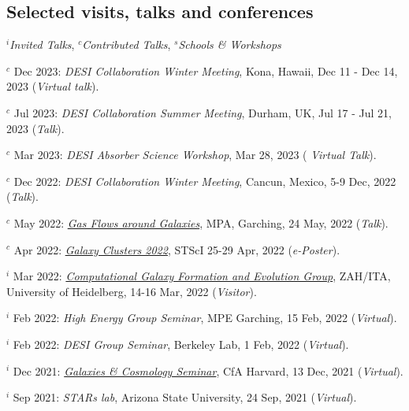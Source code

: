 \documentclass[12pt,letterpaper]{article}
\begin{document}
\subsection{Selected visits, talks and conferences}
$^i$\emph{Invited Talks}, $^c$\emph{Contributed Talks}, $^s$\emph{Schools \& Workshops}
\begin{list}{}{\cvlist}
\item $^c$ Dec 2023:  \emph{DESI Collaboration Winter Meeting}, Kona, Hawaii, Dec 11 - Dec 14, 2023 (\textit{Virtual talk}).
\item $^c$ Jul 2023:  \emph{DESI Collaboration Summer Meeting}, Durham, UK, Jul 17 - Jul 21, 2023 (\textit{Talk}). 
\item $^c$ Mar 2023:  \emph{DESI Absorber Science Workshop}, Mar 28, 2023 (\textit{ Virtual Talk}).   
\item $^c$ Dec 2022:  \emph{DESI Collaboration Winter Meeting}, Cancun, Mexico, 5-9 Dec, 2022 (\textit{Talk}).   
\item $^c$ May 2022:  \emph{\href{https://indico.ph.tum.de/event/7018/}{Gas Flows around Galaxies}}, MPA, Garching, 24 May, 2022 (\textit{Talk}).   
\item $^c$ Apr 2022:  \emph{\href{https://www.stsci.edu/contents/events/stsci/2022/april/galaxy-clusters-2022-challenging-our-cosmological-perspectives}{Galaxy Clusters 2022}}, STScI 25-29 Apr, 2022 (\textit{e-Poster}).   
\item $^i$ Mar 2022:  \emph{\href{https://zah.uni-heidelberg.de/research-groups\#c2659}{Computational Galaxy Formation and Evolution Group}}, ZAH/ITA, University of Heidelberg, 14-16 Mar, 2022 (\textit{Visitor}).   
\item $^i$ Feb 2022:  \emph{High Energy Group Seminar}, MPE Garching, 15 Feb, 2022 (\textit{Virtual}).   
\item $^i$ Feb 2022:  \emph{DESI Group Seminar}, Berkeley Lab, 1 Feb, 2022 (\textit{Virtual}).   
\item $^i$ Dec 2021:  \emph{\href{https://pweb.cfa.harvard.edu/calendar/event/9298}{Galaxies \& Cosmology Seminar}}, CfA Harvard, 13 Dec, 2021 (\textit{Virtual}).   
\item $^i$ Sep 2021:  \textit{STARs lab}, Arizona State University, 24 Sep, 2021 (\textit{Virtual}).   


\end{list}
\end{document}
